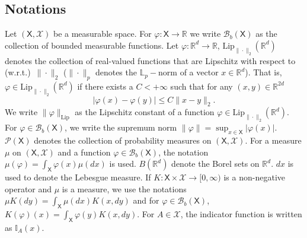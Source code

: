 \documentclass[english]{article}
\begin{document}
\subsection{Notations}\label{sec:notation}

Let $(\mathsf{X},\mathcal{X})$ be a measurable space.
For $\varphi:\mathsf{X}\rightarrow\mathbb{R}$ we write $\mathcal{B}_b(\mathsf{X})$ as the collection of bounded measurable functions. 
Let $\varphi:\mathbb{R}^d\rightarrow\mathbb{R}$, $\textrm{Lip}_{\|\cdot\|_2}(\mathbb{R}^{d})$ denotes the collection of real-valued functions that are Lipschitz with respect to (w.r.t.)~$\|\cdot\|_2$ ($\|\cdot\|_p$ denotes the $\mathbb{L}_p-$norm of a vector $x\in\mathbb{R}^d$). That is, $\varphi\in\textrm{Lip}_{\|\cdot\|_2}(\mathbb{R}^{d})$ if there exists a $C<+\infty$ such that for any $(x,y)\in\mathbb{R}^{2d}$
$$
|\varphi(x)-\varphi(y)| \leq C\|x-y\|_2.
$$
We write $\|\varphi\|_{\textrm{Lip}}$ as the Lipschitz constant of a function $\varphi\in\textrm{Lip}_{\|\cdot\|_2}(\mathbb{R}^{d})$.
For $\varphi\in\mathcal{B}_b(\mathsf{X})$, we write the supremum norm $\|\varphi\|=\sup_{x\in\mathsf{X}}|\varphi(x)|$.
$\mathcal{P}(\mathsf{X})$  denotes the collection of probability measures on $(\mathsf{X},\mathcal{X})$.
For a measure $\mu$ on $(\mathsf{X},\mathcal{X})$
and a function $\varphi\in\mathcal{B}_b(\mathsf{X})$, the notation $\mu(\varphi)=\int_{\mathsf{X}}\varphi(x)\mu(dx)$ is used. 
$B(\mathbb{R}^d)$ denote the Borel sets on $\mathbb{R}^d$. $dx$ is used to denote the Lebesgue measure.
If $K:\mathsf{X}\times\mathcal{X}\rightarrow[0,\infty)$ is a non-negative operator and $\mu$ is a measure, we use the notations
$
\mu K(dy) = \int_{\mathsf{X}}\mu(dx) K(x,dy)
$
and for $\varphi\in\mathcal{B}_b(\mathsf{X})$, 
$
K(\varphi)(x) = \int_{\mathsf{X}} \varphi(y) K(x,dy).
$
For $A\in\mathcal{X}$, the indicator function is written as $\mathbb{I}_A(x)$.
\end{document}
